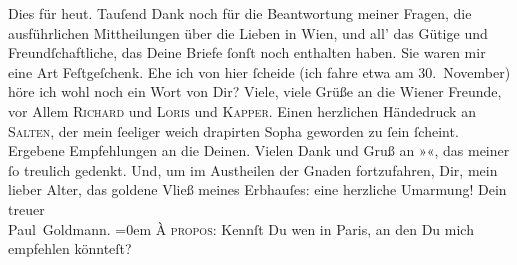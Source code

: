 \begin{ledgroupsized}[t]{13cm}
           \pstart
           Dies für heut. Tauſend Dank noch für die Beantwortung
               meiner Fragen, die ausführlichen Mittheilungen über die Lieben in Wien, und all’ das Gütige und Freundſchaftliche, das Deine {\pb}Briefe ſonſt noch enthalten haben. Sie waren mir
               eine Art Feſtgeſchenk. Ehe ich von hier ſcheide (ich fahre etwa am 30. November) höre ich wohl noch ein Wort von Dir? Viele,
               viele Grüße an die Wiener Freunde, vor Allem \textsc{Richard} und \textsc{Loris} und \textsc{Kapper}. Einen herzlichen Händedruck an \textsc{Salten}, der mein ſeeliger \label{K_L02670-555v}\label{K_L02670-555h} weich
               drapirten Sopha geworden zu ſein ſcheint. Ergebene Empfehlungen an die Deinen. Vielen
               Dank und Gruß an »\label{K_L02670-77v}\label{K_L02670-77h}«, das meiner ſo treulich gedenkt. Und, um im Austheilen der Gnaden
               fortzufahren, Dir, mein lieber Alter, das goldene Vließ meines Erbhauſes: eine
               herzliche Umarmung!\pend
           \pstart
           Dein {\\[\baselineskip]}treuer {\\[\baselineskip]}\spacefill\mbox{Paul Goldmann.}\pend
           \leftskip=0em{}\pstart
           \noindent{}\textsc{À propos}: Kennſt Du wen in Paris, an den Du mich empfehlen könnteſt?\pend
                     \endnumbering{}\end{ledgroupsized}  \newcommand{\dateiname}{L02670}\newcommand{\titel}{Paul Goldmann an Arthur Schnitzler, 15. 11. 1891}\newcommand{\editorInnen}{Martin Anton Müller und Laura Untner}
            \footnotesize
\begin{ledgroupsized}[t]{11.5cm}
\end{ledgroupsized}
         
      